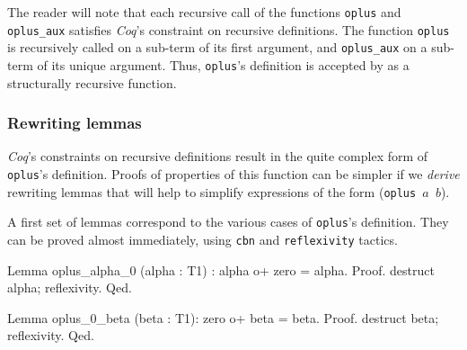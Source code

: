 \documentclass[a4paper]{book}
\begin{document}
The reader will note that each recursive call of the functions
\texttt{oplus} and \texttt{oplus\_aux} satisfies \emph{Coq}'s constraint
on recursive definitions. The function \texttt{oplus} is recursively called on a sub-term of its first argument,
and \texttt{oplus\_aux} on a sub-term of its unique argument.
Thus, \texttt{oplus}'s definition is accepted by \coq{} as a structurally recursive function.

\subsubsection{Rewriting lemmas}
\label{sec:orgheadline86}

\emph{Coq}'s constraints on recursive definitions result in 
the quite  complex form of \texttt{oplus}'s definition.
Proofs of properties of this function can be simpler if we
 \emph{derive} rewriting lemmas that will help to simplify 
expressions of the form (\texttt{oplus $a$ $ b$}).

A first set of lemmas correspond to the various cases of \texttt{oplus}'s 
definition. They can be proved almost immediately, using \texttt{cbn} 
and \texttt{reflexivity} tactics.



\begin{Coqsrc}
Lemma oplus_alpha_0 (alpha : T1) : alpha o+ zero = alpha.
Proof.
  destruct alpha; reflexivity.
Qed.

Lemma oplus_0_beta (beta : T1): zero o+ beta = beta.
Proof.
  destruct beta; reflexivity.
Qed.
\end{Coqsrc}






\end{document}
